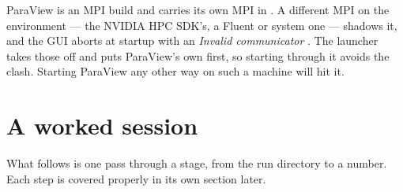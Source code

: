\documentclass[11pt,a4paper]{article}
\begin{document}
ParaView is an MPI build and carries its own MPI in . A different MPI
on the environment --- the NVIDIA HPC SDK's, a Fluent or system one --- shadows
it, and the GUI aborts at startup with an \emph{Invalid communicator}
. The launcher takes those off  and puts ParaView's
own  first, so starting through it avoids the clash. Starting ParaView
any other way on such a machine will hit it.

\section{A worked session}

What follows is one pass through a stage, from the run directory to a number.
Each step is covered properly in its own section later.
\end{document}
